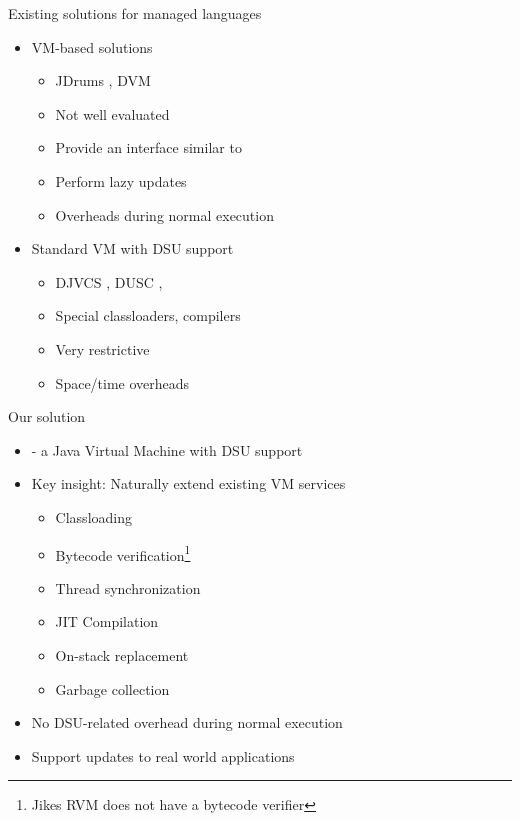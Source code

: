 \begin{frame}{Existing solutions for managed languages}%
\begin{itemize}
\item VM-based solutions
  \begin{itemize}
  \item JDrums \cite{ritzau00dynamic}, DVM \cite{Mala00a}
  \item Not well evaluated
  \item Provide an interface similar to \DSU{}
  \item Perform lazy updates
  \item Overheads during normal execution
  \end{itemize}
\item Standard VM with DSU support
  \begin{itemize}
  \item DJVCS \cite{BarrE03}, DUSC \cite{orso:java}, \cite{Milazzo05updates}
  \item Special classloaders, compilers
  \item Very restrictive
  \item Space/time overheads
  \end{itemize}
\end{itemize}

\end{frame}


\begin{frame}{Our solution}%
\begin{itemize}
\item \DSU{} - a Java Virtual Machine with DSU support
\item Key insight: Naturally extend existing VM services
  \begin{itemize}
  \item Classloading
  \item Bytecode verification\footnote{Jikes RVM does not have a bytecode
  verifier}
  \item Thread synchronization
  \item JIT Compilation
  \item On-stack replacement
  \item Garbage collection
  \end{itemize}
\item No DSU-related overhead during normal execution
\item Support updates to real world applications
\end{itemize}
\end{frame}

